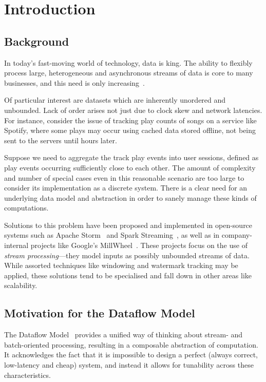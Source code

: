 \chapter{Introduction}\label{ch:intro}

\section{Background}\label{sec:intro:background}

In today's fast-moving world of technology, data is king.
The ability to flexibly process large, heterogeneous and asynchronous streams of data is core to many businesses, and this need is only increasing~\cite{Yin_2015}\cite{mit_bean_variety}.

Of particular interest are datasets which are inherently unordered and unbounded.
Lack of order arises not just due to clock skew and network latencies.
For instance, consider the issue of tracking play counts of songs on a service like Spotify, where some plays may occur using cached data stored offline, not being sent to the servers until hours later.

Suppose we need to aggregate the track play events into user sessions, defined as play events occurring sufficiently close to each other.
The amount of complexity and number of special cases even in this reasonable scenario are too large to consider its implementation as a discrete system.
There is a clear need for an underlying data model and abstraction in order to sanely manage these kinds of computations.

Solutions to this problem have been proposed and implemented in open-source systems such as Apache Storm~\cite{apache_storm} and Spark Streaming~\cite{spark:zaharia2013discretized}, as well as in company-internal projects like Google's MillWheel~\cite{akidau2013millwheel}.
These projects focus on the use of \emph{stream processing}---they model inputs as possibly unbounded streams of data.
While assorted techniques like windowing and watermark tracking may be applied, these solutions tend to be specialised and fall down in other areas like scalability.

\section{Motivation for the Dataflow Model}\label{sec:intro:motivation}

The Dataflow Model~\cite{Akidau:2015} provides a unified way of thinking about stream- and batch-oriented processing, resulting in a composable abstraction of computation.
It acknowledges the fact that it is impossible to design a perfect (always correct, low-latency and cheap) system, and instead it allows for tunability across these characteristics.

